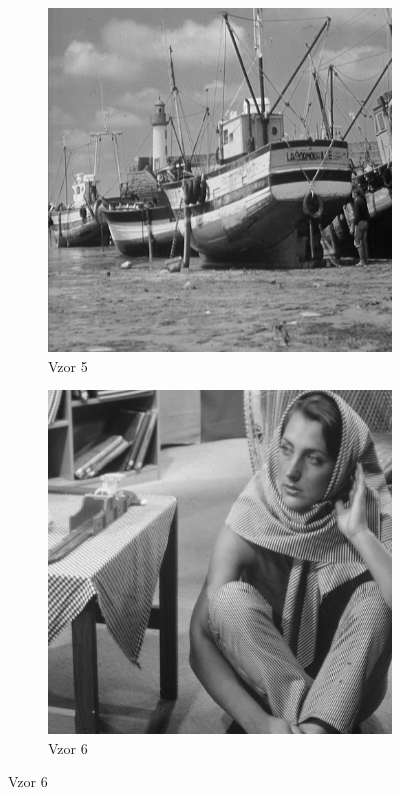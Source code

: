 \documentclass[a4paper,11pt]{scrartcl}
\begin{document}
\begin{figure}[!h]
\begin{subfigure}[b]{0.4\textwidth}
    \end{subfigure}
    \begin{subfigure}[b]{0.4\textwidth}
        \includegraphics[width=\textwidth]{img/example5.png}
        \caption{Vzor 5}
        \label{fig:gull}
    \end{subfigure}
    \begin{subfigure}[b]{0.4\textwidth}
        \includegraphics[width=\textwidth]{img/example6.png}
        \caption{Vzor 6}
        \label{fig:gull}
    \end{subfigure}
    
\end{figure}
\end{document}
